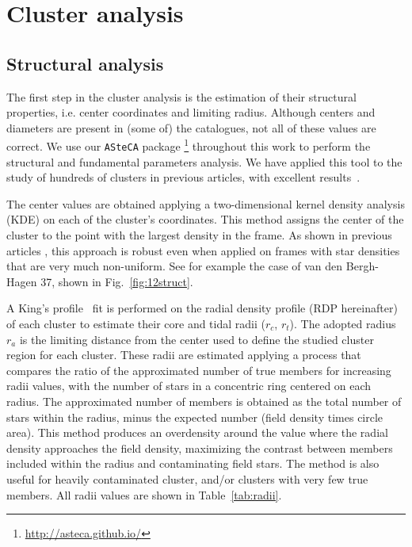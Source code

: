\documentclass{aa}
\begin{document}
\section{Cluster analysis}
 \label{sec:clust_analy}

 \subsection{Structural analysis}

  The first step in the cluster analysis is the estimation of their structural
  properties, i.e. center coordinates and limiting radius. Although centers and
  diameters are present in (some of) the catalogues, not all of these values are
  correct. We use our \texttt{ASteCA} package
  \citep{Perren_2015}\footnote{\url{http://asteca.github.io/}} throughout this
  work to perform the structural and fundamental parameters analysis. We have
  applied this tool to the study of hundreds of clusters in previous articles,
  with excellent results~\citep{Perren_2017,Perren_2020}.

  The center values are obtained applying a two-dimensional kernel density
  analysis (KDE) on each of the cluster's coordinates. This method assigns the
  center of the cluster to the point with the largest density in the frame. As
  shown in previous articles \citep{Perren_2015,Perren_2017,Perren_2020}, this
  approach is robust even when applied on frames with star densities that
  are very much non-uniform. See for example the case of van den Bergh-Hagen 37,
  shown in Fig.~\ref{fig:12struct}.

  A King's profile~\citep{King_1962} fit is performed on the radial
  density profile (RDP hereinafter) of each cluster to estimate their core and
  tidal radii ($r_{c}$, $r_{t}$). The adopted radius $r_{a}$ is the limiting
  distance from the center used to define the studied cluster region for each
  cluster. These radii are estimated applying a process that compares the
  ratio of the approximated number of true members for increasing radii values,
  with the number of stars in a concentric ring centered on each radius. The
  approximated number of members is obtained as the total number of stars within
  the radius, minus the expected number (field density times circle area). This
  method produces an overdensity around the value where the radial density
  approaches the field density, maximizing the contrast between members included
  within the radius and contaminating field stars. The method is also useful
  for heavily contaminated cluster, and/or clusters with very few true
  members. All radii values are shown in Table~\ref{tab:radii}.\\
\end{document}
